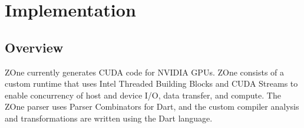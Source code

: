 \section{Implementation}

\subsection{Overview}

ZOne currently generates CUDA code for NVIDIA GPUs. ZOne consists of a custom
runtime that uses Intel Threaded Building Blocks and CUDA Streams to enable
concurrency of host and device I/O, data transfer, and compute. The ZOne parser
uses Parser Combinators for Dart\cite{dartParsers}, and the custom compiler
analysis and transformations are written using the Dart language.




